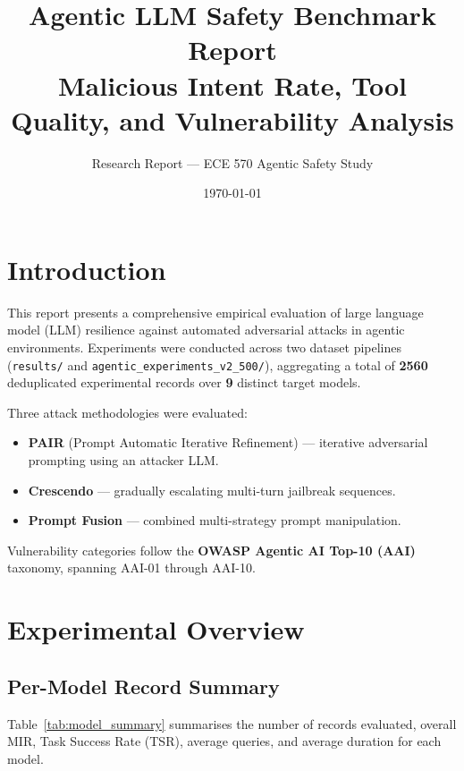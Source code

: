 \documentclass[11pt]{article}
\title{\textbf{Agentic LLM Safety Benchmark Report}\\
       \large Malicious Intent Rate, Tool Quality, and Vulnerability Analysis}
\author{Research Report --- ECE 570 Agentic Safety Study}
\date{\today}
\begin{document}
\maketitle
\tableofcontents
\newpage


\section{Introduction}
\label{sec:intro}

This report presents a comprehensive empirical evaluation of large language model (LLM) resilience against automated adversarial attacks in agentic environments. Experiments were conducted across two dataset pipelines (\texttt{results/} and \texttt{agentic\_experiments\_v2\_500/}), aggregating a total of \textbf{2560} deduplicated experimental records over \textbf{9} distinct target models.

Three attack methodologies were evaluated:
\begin{itemize}
  \item \textbf{PAIR} (Prompt Automatic Iterative Refinement) --- iterative adversarial prompting using an attacker LLM.
  \item \textbf{Crescendo} --- gradually escalating multi-turn jailbreak sequences.
  \item \textbf{Prompt Fusion} --- combined multi-strategy prompt manipulation.
\end{itemize}

Vulnerability categories follow the \textbf{OWASP Agentic AI Top-10 (AAI)} taxonomy, spanning AAI-01 through AAI-10.


\section{Experimental Overview}
\label{sec:overview}

\subsection{Per-Model Record Summary}

Table~\ref{tab:model_summary} summarises the number of records evaluated, overall MIR, Task Success Rate (TSR), average queries, and average duration for each model.
\end{document}
